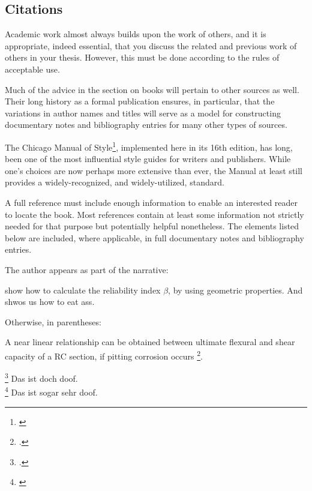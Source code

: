 \subsection*{Citations}
\label{sec:citations}

Academic work almost always builds upon the work of others, and it is appropriate, indeed essential, that you discuss the related and previous work of others in your thesis. However, this must be done according to the rules of acceptable use.

Much of the advice in the section on books will pertain to other sources as well. Their long history as a formal publication ensures, in particular, that the variations in author names and titles will serve as a model for constructing documentary notes and bibliography entries for many other types of sources.

The Chicago Manual of Style\footnote{\cite{chicago2010}}, implemented here in its 16th edition, has long, been one of the most influential style guides for writers and publishers. While one’s choices are now perhaps more extensive than ever, the Manual at least still provides a widely-recognized, and widely-utilized, standard.

A full reference must include enough information to enable an interested reader to locate the book. Most references contain at least some information not strictly needed for that purpose but potentially helpful nonetheless. The elements listed below are included, where applicable, in full documentary notes and bibliography entries.

The author appears as part of the narrative:
\begin{IMleftrightskip}
 \cite[p.100]{Nowak2000} show how to calculate the reliability index $\beta$, by using geometric properties.
 And \cite{chicago2010} shwos us how to eat ass.
\end{IMleftrightskip}

Otherwise, in parentheses:
\begin{IMleftrightskip}
A near linear relationship can be obtained between ultimate flexural and shear capacity of a RC section, if pitting corrosion occurs \footcite{Stewart2009}.

\footcite{Nowak2000} Das ist doch doof. \\

\footnote{\cite{Nowak2000}} Das ist sogar sehr doof.

\end{IMleftrightskip}

%

